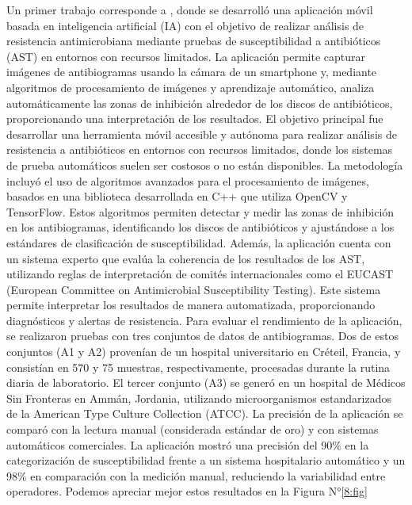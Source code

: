 Un primer trabajo corresponde a \parencite{pascucci2021}, donde se desarrolló una aplicación móvil basada en inteligencia artificial (IA) con el objetivo de realizar análisis de resistencia antimicrobiana mediante pruebas de susceptibilidad a antibióticos (AST) en entornos con recursos limitados. La aplicación permite capturar imágenes de antibiogramas usando la cámara de un smartphone y, mediante algoritmos de procesamiento de imágenes y aprendizaje automático, analiza automáticamente las zonas de inhibición alrededor de los discos de antibióticos, proporcionando una interpretación de los resultados.
El objetivo principal fue desarrollar una herramienta móvil accesible y autónoma para realizar análisis de resistencia a antibióticos en entornos con recursos limitados, donde los sistemas de prueba automáticos suelen ser costosos o no están disponibles. La metodología incluyó el uso de algoritmos avanzados para el procesamiento de imágenes, basados en una biblioteca desarrollada en C++ que utiliza OpenCV y TensorFlow. Estos algoritmos permiten detectar y medir las zonas de inhibición en los antibiogramas, identificando los discos de antibióticos y ajustándose a los estándares de clasificación de susceptibilidad. Además, la aplicación cuenta con un sistema experto que evalúa la coherencia de los resultados de los AST, utilizando reglas de interpretación de comités internacionales como el EUCAST (European Committee on Antimicrobial Susceptibility Testing). Este sistema permite interpretar los resultados de manera automatizada, proporcionando diagnósticos y alertas de resistencia.
Para evaluar el rendimiento de la aplicación, se realizaron pruebas con tres conjuntos de datos de antibiogramas. Dos de estos conjuntos (A1 y A2) provenían de un hospital universitario en Créteil, Francia, y consistían en 570 y 75 muestras, respectivamente, procesadas durante la rutina diaria de laboratorio. El tercer conjunto (A3) se generó en un hospital de Médicos Sin Fronteras en Ammán, Jordania, utilizando microorganismos estandarizados de la American Type Culture Collection (ATCC). La precisión de la aplicación se comparó con la lectura manual (considerada estándar de oro) y con sistemas automáticos comerciales. La aplicación mostró una precisión del 90\% en la categorización de susceptibilidad frente a un sistema hospitalario automático y un 98\% en comparación con la medición manual, reduciendo la variabilidad entre operadores. Podemos apreciar mejor estos resultados en la Figura N°\ref{8:fig}

